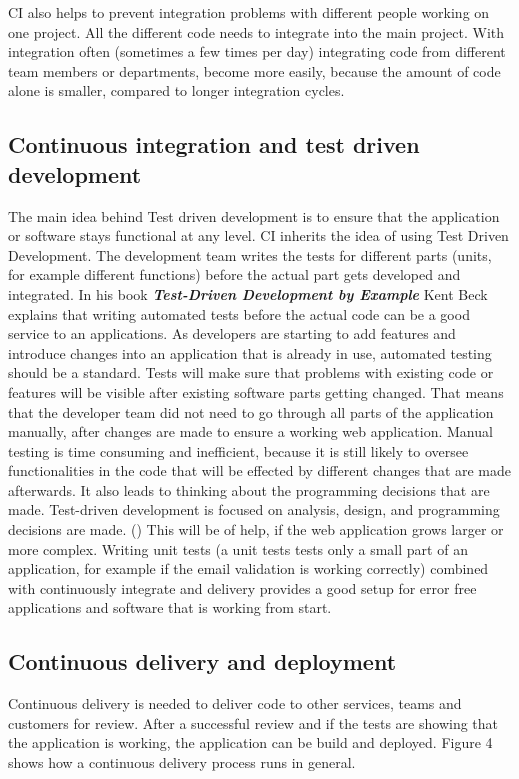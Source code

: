 CI also helps to prevent integration problems with different people working on one project. All the different code needs to integrate into the main project.
With integration often (sometimes a few times per day) integrating code from different team members or departments, become more easily,
because the amount of code alone is smaller, compared to longer integration cycles.


\subsection{Continuous integration and test driven development}
The main idea behind Test driven development is to ensure that the application or software stays functional at any level.
CI inherits the idea of using Test Driven Development. The development team writes the tests for different parts (units, for example different functions)
before the actual part gets developed and integrated.
In his book \textbf{\textit{Test-Driven Development by Example}} Kent Beck explains that writing automated tests before the actual code can be a good service
to an applications. As developers are starting to add features and introduce changes into an application that is already in use, automated testing should be a standard.
Tests will make sure that problems with existing code or features will be visible after existing software parts getting changed. That means that the
developer team did not need to go through all parts of the application manually, after changes are made to ensure a working web application. Manual testing is
time consuming and inefficient, because it is still likely to oversee functionalities in the code that will be effected by different changes that are made afterwards.
It also leads to thinking about the programming decisions that are made. Test-driven development is focused on analysis, design, and programming decisions are made.
(\cite{janzen2005test}) This will be of help, if the web application grows larger or more complex. Writing unit tests (a unit tests tests only a small
part of an application, for example if the email validation is working correctly) combined with continuously integrate and delivery provides a
good setup for error free applications and software that is working from start.

\subsection{Continuous delivery and deployment}
Continuous delivery is needed to deliver code to other services, teams and customers for review. After a successful review and if the tests are showing that the
application is working, the application can be build and deployed. Figure 4 shows how a continuous delivery process runs in general.

